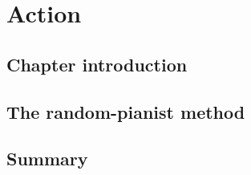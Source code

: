 \chapter{Action}
\minitoc
\section{Chapter introduction}
\section{The random-pianist method}
\section{Summary}
